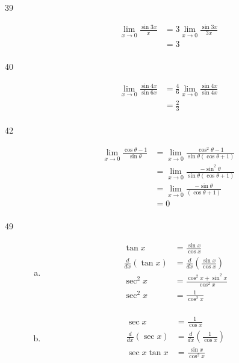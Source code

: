 \documentclass[letterpaper, landscape]{exam}
\begin{document}
\begin{description}
    \item[39] 
      \begin{align*}
        \lim_{x \to 0} \frac{\sin 3x}{x} & = 3 \lim_{x \to 0} \frac{\sin 3x}{3x} \\
                                         & = \boxed{ 3 } \\
      \end{align*}

    \item[40] 
      \begin{align*}
        \lim_{x \to 0} \frac{\sin 4x}{\sin 6x} & = \frac{4}{6} \lim_{x \to 0} \frac{\sin 4x}{\sin 4x} \\
                                               & = \boxed{ \frac{2}{3} } \\
      \end{align*}

    \item[42] 
      \begin{align*}
        \lim_{x \to 0} \frac{\cos \theta - 1}{\sin \theta} 
          & = \lim_{x \to 0} \frac{\cos^2 \theta - 1}{\sin \theta (\cos \theta + 1)} \\
          & = \lim_{x \to 0} \frac{- \sin^2 \theta}{\sin \theta (\cos \theta + 1)} \\
          & = \lim_{x \to 0} \frac{- \sin \theta}{(\cos \theta + 1)} \\
          & = \boxed{ 0 } \\
      \end{align*}

    \newpage

    \item[49]
      \begin{enumerate}[(a)]
        \item 
          \begin{align*}
            \tan x                  & = \frac{\sin x}{\cos x} \\
            \frac{d}{dx} ( \tan x ) & = \frac{d}{dx} \left( \frac{\sin x}{\cos x} \right) \\
            \sec^2 x                & =  \frac{\cos^2 x + \sin^2 x}{\cos^2 x} \\
            \sec^2 x                & =  \frac{1}{\cos^2 x} \\
          \end{align*}

        \item
          \begin{align*}
            \sec x                  & = \frac{1}{\cos x} \\
            \frac{d}{dx} ( \sec x ) & = \frac{d}{dx} \left( \frac{1}{\cos x} \right) \\
            \sec x \tan x           & = \frac{\sin x}{\cos^2 x} \\
          \end{align*}


\end{enumerate}
\end{description}
\end{document}
